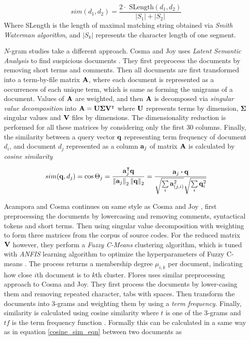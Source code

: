 \begin{equation}
    sim(d_1, d_2) = \dfrac{2 \cdot \text{ SLength}(d_1, d_2)}{|S_1| + |S_2|}
\end{equation}
\noindent
Where SLength is the length of maximal matching string obtained via  \emph{Smith Waterman algorithm}, and $|S_k|$ represents the character length of one segment. 


$N$-gram studies take a different approach. Cosma and Joy uses \emph{Latent Semantic Analysis} to find suspicious documents \cite{AASCPD2012}. They first preprocess the documents by removing \eg short terms and comments. Then all documents are first transformed into a term-by-file matrix $\mathbf{A}$, where each document is represented as a occurrences of each unique term, which is same as forming the unigrams of a document. Values of $\mathbf{A}$ are weighted, and then $\mathbf{A}$ is decomposed via \emph{singular value decomposition} into $\mathbf{A} = \mathbf{U}\mathbf{\Sigma}\mathbf{V}^\intercal$ where $\mathbf{U}$ represents terms by dimension, $\mathbf{\Sigma}$ singular values and $\mathbf{V}$ files by dimensions. The dimensionality reduction is performed for all these matrices by considering only the first 30 columns. Finally, the similarity between a query vector $\mathbf{q}$ representing term frequency of document $d_i$, and document $d_j$ represented as a column $\mathbf{a}_j$ of matrix $\mathbf{A}$ is calculated by \emph{cosine similarity} \cite{AASCPD2012}

\begin{equation}\label{cosine_sim_eqn}
    sim(\mathbf{q}, d_j) = \cos \Theta_j = \dfrac{\mathbf{a}_j^\intercal \mathbf{q}}{\left\lVert\mathbf{a}_j\right\rVert_2 \left\lVert\mathbf{q}\right\rVert_2} = \dfrac{\mathbf{a}_j \boldsymbol{\cdot} \mathbf{q}}{\sqrt{\sum \limits_{i} \mathbf{a}_{(j, i)}^2} \sqrt{\sum \limits_{i} \mathbf{q}_i^2}}
\end{equation}

\noindent
Acampora and Cosma \cite{AFAPLI2015} continues on same style as Cosma and Joy \cite{AASCPD2012}, first preprocessing the documents by lowercasing and removing comments, syntactical tokens and short terms. Then using singular value decomposition with weighting to form three matrices from the corpus of source codes. For the reduced matrix $\mathbf{V}$ however, they perform a \emph{Fuzzy C-Means} clustering algorithm, which is tuned with \emph{ANFIS} learning algorithm to optimize the hyperparameters of Fuzzy C-means \cite{AFAPLI2015}. The process returns a membership degree $\mu_{i, k}$ per document, indicating how close $i$th document is to $k$th cluster. 
\noindent
Flores \etal \cite{USCR2014} uses similar preprocessing approach to Cosma and Joy. They first process the documents by lower-casing them and removing repeated character, tabs with spaces. Then transform the documents into $3$-grams and weighting them by using a \emph{term frequency}. Finally, similarity is calculated using cosine similarity where $t$ is one of the 3-grams and $tf$ is the term frequency function \cite{USCR2014}. Formally this can be calculated in a same way as in equation \ref{cosine_sim_eqn} between two documents as

